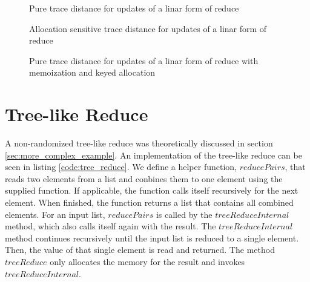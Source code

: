 \begin{figure}
\centering
{}
\caption{Pure trace distance for updates of a linar form of reduce}
\label{plot:reduce_pure}
\end{figure}

\begin{figure}
\centering
{}
\caption{Allocation sensitive trace distance for updates of a linar form of reduce}
\label{plot:reduce_alloc}
\end{figure}

\begin{figure}
\centering
{}
\caption{Pure trace distance for updates of a linar form of reduce with memoization and keyed allocation}
\label{plot:memo_reduce_pure}
\end{figure}

\section{Tree-like Reduce}

A non-randomized tree-like reduce was theoretically discussed in section \ref{sec:more_complex_example}. An implementation of the tree-like reduce can be seen in listing \ref{code:tree_reduce}. We define a helper function, $reducePairs$, that reads two elements from a list and conbines them to one element using the supplied function. If applicable, the function calls itself recursively for the next element. When finished, the function returns a list that contains all combined elements. For an input list, $reducePairs$ is called by the $treeReduceInternal$ method, which also calls itself again with the result. The $treeReduceInternal$ method continues recursively until the input list is reduced to a single element. Then, the value of that single element is read and returned. The method $treeReduce$ only allocates the memory for the result and invokes $treeReduceInternal$.


